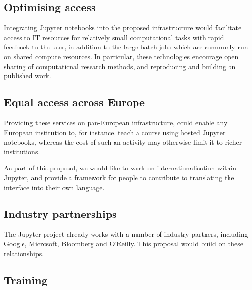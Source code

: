 
\subsection{Optimising access}

Integrating Jupyter notebooks into the proposed infrastructure would facilitate
access to IT resources for relatively small computational tasks with rapid
feedback to the user, in addition to the large batch jobs which are commonly
run on shared compute resources. In particular, these technologies encourage
open sharing of computational research methods, and reproducing and building on
published work.


\subsection{Equal access across Europe}

Providing these services on pan-European infrastructure, could enable any
European institution to, for instance, teach a course using hosted Jupyter
notebooks, whereas the cost of such an activity may otherwise limit it to richer
institutions.

As part of this proposal, we would like to work on internationalisation within
Jupyter, and provide a framework for people to contribute to translating the
interface into their own language.


\subsection{Industry partnerships}

The Jupyter project already works with a number of industry partners, including
Google, Microsoft, Bloomberg and O'Reilly. This proposal would build on these
relationships.


\subsection{Training}

